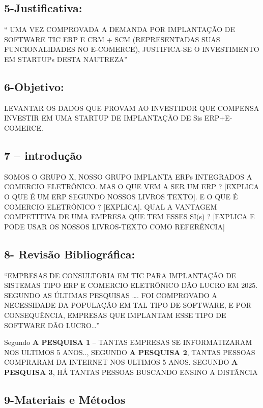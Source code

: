 \documentclass[
]{book}
\begin{document}
\subsection{5-Justificativa:}\label{justificativa}

`` UMA VEZ COMPROVADA A DEMANDA POR IMPLANTAÇÃO DE SOFTWARE TIC ERP E CRM + SCM (REPRESENTADAS SUAS FUNCIONALIDADES NO E-COMERCE), JUSTIFICA-SE O INVESTIMENTO EM STARTUPs DESTA NAUTREZA''

\subsection{6-Objetivo:}\label{objetivo}

LEVANTAR OS DADOS QUE PROVAM AO INVESTIDOR QUE COMPENSA INVESTIR EM UMA STARTUP DE IMPLANTAÇÃO DE Sis ERP+E-COMERCE.

\subsection{7 -- introdução}\label{introduuxe7uxe3o}

SOMOS O GRUPO X, NOSSO GRUPO IMPLANTA ERPs INTEGRADOS A COMERCIO ELETRÔNICO. MAS O QUE VEM A SER UM ERP ? {[}EXPLICA O QUE É UM ERP SEGUNDO NOSSOS LIVROS TEXTO{]}. E O QUE É COMERCIO ELETRÔNICO ? {[}EXPLICA{]}. QUAL A VANTAGEM COMPETITIVA DE UMA EMPRESA QUE TEM ESSES SI(s) ? {[}EXPLICA E PODE USAR OS NOSSOS LIVROS-TEXTO COMO REFERÊNCIA{]}

\subsection{8- Revisão Bibliográfica:}\label{revisuxe3o-bibliogruxe1fica}

``EMPRESAS DE CONSULTORIA EM TIC PARA IMPLANTAÇÃO DE SISTEMAS TIPO ERP E COMERCIO ELETRÔNICO DÃO LUCRO EM 2025. SEGUNDO AS ÚLTIMAS PESQUISAS \ldots. FOI COMPROVADO A NECESSIDADE DA POPULAÇÃO EM TAL TIPO DE SOFTWARE, E POR CONSEQUÊNCIA, EMPRESAS QUE IMPLANTAM ESSE TIPO DE SOFTWARE DÃO LUCRO\ldots{}''

Segundo \textbf{A PESQUISA 1} -- TANTAS EMPRESAS SE INFORMATIZARAM NOS ULTIMOS 5 ANOS.., SEGUNDO \textbf{A PESQUISA 2}, TANTAS PESSOAS COMPRARAM DA INTERNET NOS ULTIMOS 5 ANOS. SEGUNDO \textbf{A PESQUISA 3}, HÁ TANTAS PESSOAS BUSCANDO ENSINO A DISTÂNCIA

\subsection{9-Materiais e Métodos}\label{materiais-e-muxe9todos}
\end{document}
